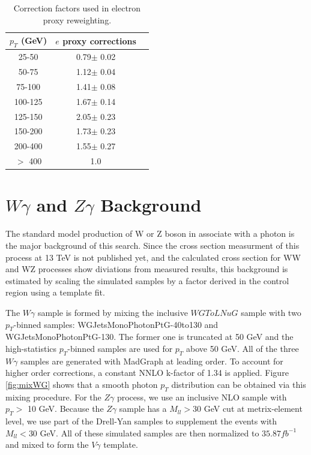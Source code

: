 \documentclass[thesis.tex]{subfiles}
\renewcommand\_{\textunderscore\allowbreak}
\begin{document}
\begin{table}[ht]
  \caption{Correction factors used in electron proxy reweighting.}
	\centering
  \begin{tabular}{|c|c|c|}
  \hline
  $p_T$ (GeV)  & $e$ proxy corrections \\ \hline
  25-50  & 0.79$\pm$ 0.02  \\ \hline
  50-75  & 1.12$\pm$ 0.04  \\ \hline
  75-100 & 1.41$\pm$ 0.08  \\ \hline 
  100-125& 1.67$\pm$ 0.14  \\ \hline 
  125-150& 2.05$\pm$ 0.23  \\ \hline 
  150-200& 1.73$\pm$ 0.23  \\ \hline
  200-400& 1.55$\pm$ 0.27  \\ \hline
  $>$ 400& 1.0 \\ \hline 
  \end{tabular}
  \label{table:correctionsfakelep}
\end{table}

\section{$W\gamma$ and $Z\gamma$ Background}\label{subsec:VG}
The standard model production of W or Z boson in associate with a photon is the major background of this search. Since the cross section measurment of this process at 13 TeV is not published yet, and the calculated cross section for WW and WZ processes show diviations from measured results, this background is estimated by scaling the simulated samples by a factor derived in the control region using a template fit. 

The $W\gamma$ sample is formed by mixing the inclusive $WGToLNuG$ sample with two $p_T$-binned samples: WGJets\_MonoPhoton\_PtG-40to130 and WGJets\_MonoPhoton\_PtG-130. The former one is truncated at 50 GeV and the high-statistics $p_T$-binned samples are used for $p_T$ above 50 GeV. All of the three $W\gamma$ samples are generated with MadGraph at leading order. To account for higher order corrections, a constant NNLO k-factor of 1.34 is applied. Figure \ref{fig:mixWG} shows that a smooth photon $p_{T}$ distribution can be obtained via this mixing procedure. For the $Z\gamma$ process, we use an inclusive NLO sample with $p_T >$ 10 GeV. Because the $Z\gamma$ sample has a $M_{ll} > 30$ GeV cut at metrix-element level, we use part of the Drell-Yan samples to supplement the events with $M_{ll} < 30$ GeV. All of these simulated samples are then normalized to $35.87 fb^{-1}$ and mixed to form the $V\gamma$ template.
\end{document}
